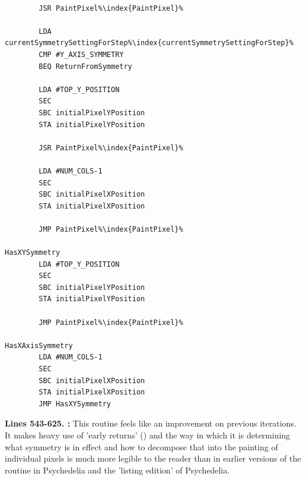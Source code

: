 \begin{lstlisting}[caption = The routine responsible for handling the symmetry in use for painting pixels.,escapechar=\%]

        JSR PaintPixel%\index{PaintPixel}%

        LDA currentSymmetrySettingForStep%\index{currentSymmetrySettingForStep}%
        CMP #Y_AXIS_SYMMETRY
        BEQ ReturnFromSymmetry

        LDA #TOP_Y_POSITION
        SEC 
        SBC initialPixelYPosition
        STA initialPixelYPosition

        JSR PaintPixel%\index{PaintPixel}%

        LDA #NUM_COLS-1
        SEC 
        SBC initialPixelXPosition
        STA initialPixelXPosition

        JMP PaintPixel%\index{PaintPixel}%

HasXYSymmetry   
        LDA #TOP_Y_POSITION
        SEC 
        SBC initialPixelYPosition
        STA initialPixelYPosition

        JMP PaintPixel%\index{PaintPixel}%

HasXAxisSymmetry   
        LDA #NUM_COLS-1
        SEC 
        SBC initialPixelXPosition
        STA initialPixelXPosition
        JMP HasXYSymmetry
\end{lstlisting}

\textbf{Lines 543-625. :} This routine feels like an improvement on
previous iterations. It makes heavy use of 'early returns' () and the way in which it is
determining what symmetry is in effect and how to decompose that into the painting of individual pixels is much more
legible to the reader than in earlier versions of the routine in Psychedelia and the 'listing edition' of Psychedelia.

\clearpage

